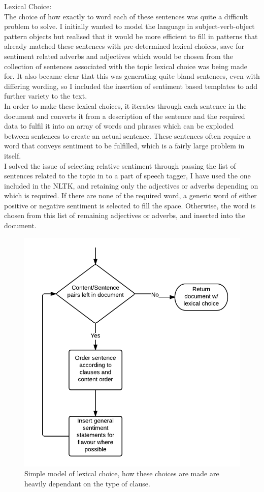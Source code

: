 Lexical Choice:\\
The choice of how exactly to word each of these sentences was quite a difficult problem to solve. I initially wanted to model the language in subject-verb-object pattern objects but realised that it would be more efficient to fill in patterns that already matched these sentences with pre-determined lexical choices, save for sentiment related adverbs and adjectives which would be chosen from the collection of sentences associated with the topic lexical choice was being made for. It also became clear that this was generating quite bland sentences, even with differing wording, so I included the insertion of sentiment based templates to add further variety to the text.\\
In order to make these lexical choices, it iterates through each sentence in the document and converts it from a description of the sentence and the required data to fulfil it into an array of words and phrases which can be exploded between sentences to create an actual sentence. These sentences often require a word that conveys sentiment to be fulfilled, which is a fairly large problem in itself.\\
I solved the issue of selecting relative sentiment through passing the list of sentences related to the topic in to a part of speech tagger, I have used the one included in the NLTK, and retaining only the adjectives or adverbs depending on which is required. If there are none of the required word, a generic word of either positive or negative sentiment is selected to fill the space. Otherwise, the word is chosen from this list of remaining adjectives or adverbs, and inserted into the document.\\

\begin{figure}
\centering
\includegraphics[width=0.7\linewidth]{figures/diagrams_etc/lex_choice}
\caption{Simple model of lexical choice, how these choices are made are heavily dependant on the type of clause.}
\label{fig:lexchoice}
\end{figure}


